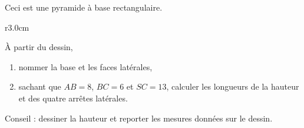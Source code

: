 
\begin{exercice}\label{exo2smath-0181}

    Ceci est une pyramide à base rectangulaire.

\begin{wrapfigure}{r}{3.0cm}
   \vspace{-0.5cm}        %
   \centering
   
\end{wrapfigure}
À partir du dessin,
\begin{enumerate}
    \item
        nommer la base et les faces latérales,
    \item
        sachant que \( AB=8\), \( BC=6\) et \( SC=13\), calculer les longueurs de la hauteur et des quatre arrêtes latérales.
\end{enumerate}

Conseil : dessiner la hauteur et reporter les mesures données sur le dessin.


\end{exercice}
